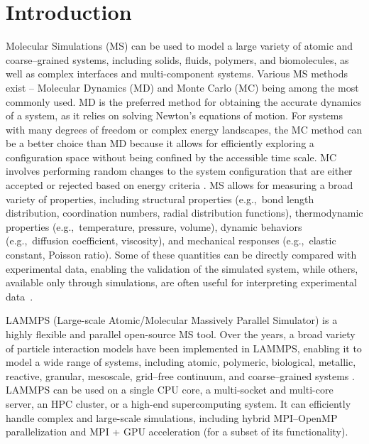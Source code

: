 \documentclass[9pt,tutorial]{livecoms}
\begin{document}
\section{Introduction}

Molecular Simulations (MS) can be used to model a large variety of
atomic and coarse--grained systems, including solids, fluids, polymers, and
biomolecules, as well as complex interfaces and multi-component systems.
Various MS methods exist -- Molecular Dynamics (MD) and Monte Carlo (MC)
being among the most commonly used.  MD is the preferred method for
obtaining the accurate dynamics of a system, as it relies on solving
Newton's equations of motion.  For systems with many degrees of freedom
or complex energy landscapes, the MC method can be a better choice than
MD because it allows for efficiently exploring a configuration space
without being confined by the accessible time scale.  MC involves
performing random changes to the system configuration that are either
accepted or rejected based on energy criteria
\cite{frenkel2023understanding, allen2017computer}.  MS allows for
measuring a broad variety of properties, including structural properties
(e.g.,~bond length distribution, coordination numbers, radial
distribution functions), thermodynamic properties (e.g.,~temperature,
pressure, volume), dynamic behaviors (e.g.,~diffusion coefficient,
viscosity), and mechanical responses (e.g.,~elastic constant, Poisson
ratio).  Some of these quantities can be directly compared with
experimental data, enabling the validation of the simulated system,
while others, available only through simulations, are often useful for
interpreting experimental data~\cite{van2008molecular}.

LAMMPS (Large-scale Atomic/Molecular Massively Parallel Simulator)
\cite{lammps_home} is a highly flexible and parallel open-source MS
tool.  Over the years, a broad variety of particle interaction models
have been implemented in LAMMPS, enabling it to model a wide range of
systems, including atomic, polymeric, biological, metallic, reactive, granular,
mesoscale, grid--free continuum, and coarse--grained systems
\cite{thompson2022lammps}.  LAMMPS can be used on a single CPU core, a
multi-socket and multi-core server, an HPC cluster, or a high-end
supercomputing system.  It can efficiently handle complex and large-scale
simulations, including hybrid MPI--OpenMP parallelization
and MPI + GPU acceleration (for a subset of its functionality).
\end{document}
